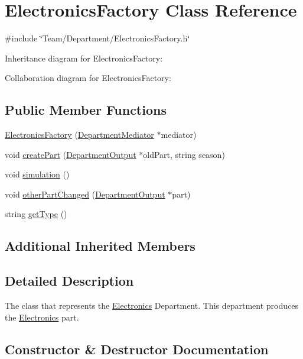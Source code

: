 \hypertarget{classElectronicsFactory}{}\section{Electronics\+Factory Class Reference}
\label{classElectronicsFactory}


{\ttfamily \#include \char`\"{}Team/\+Department/\+Electronics\+Factory.\+h\char`\"{}}



Inheritance diagram for Electronics\+Factory\+:


Collaboration diagram for Electronics\+Factory\+:
\subsection*{Public Member Functions}
\begin{DoxyCompactItemize}
\item 
\hyperlink{classElectronicsFactory_a4b74b014b01f7956076f97c3efb6c2c5}{Electronics\+Factory} (\hyperlink{classDepartmentMediator}{Department\+Mediator} $\ast$mediator)
\item 
void \hyperlink{classElectronicsFactory_a6489d0e612615f65d76620585a67ff38}{create\+Part} (\hyperlink{classDepartmentOutput}{Department\+Output} $\ast$old\+Part, string season)
\item 
void \hyperlink{classElectronicsFactory_a5e3355480264038e7ec81b83bd73353a}{simulation} ()
\item 
void \hyperlink{classElectronicsFactory_ae21ff30f4890eab2474fac71d2615941}{other\+Part\+Changed} (\hyperlink{classDepartmentOutput}{Department\+Output} $\ast$part)
\item 
string \hyperlink{classElectronicsFactory_a494fea1f1a55bca20ce1bb4c988d9d44}{get\+Type} ()
\end{DoxyCompactItemize}
\subsection*{Additional Inherited Members}


\subsection{Detailed Description}
The class that represents the \hyperlink{classElectronics}{Electronics} Department. This department produces the \hyperlink{classElectronics}{Electronics} part. 

\subsection{Constructor \& Destructor Documentation}
\mbox{\label{classElectronicsFactory_a4b74b014b01f7956076f97c3efb6c2c5}} 
